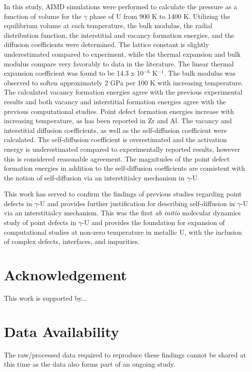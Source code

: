 \documentclass[review]{elsarticle}
\begin{document}
In this study, AIMD simulations were performed to calculate the pressure as a function of volume for the $\gamma$ phase of U from 900 K to 1400 K. Utilizing the equilibrium volume at each temperature, the bulk modulus, the radial distribution function, the interstitial and vacancy formation energies, and the diffusion coefficients were determined. The lattice constant is slightly underestimated compared to experiment, while the thermal expansion and bulk modulus compare very favorably to data in the literature. The linear thermal expansion coefficient was found to be 14.3 x 10$^{-6}$ K$^{-1}$. The bulk modulus was observed to soften approximately 2 GPa per 100 K with increasing temperature. The calculated vacancy formation energies agree with the previous experimental results and both vacancy and interstitial formation energies agree with the previous computational studies. Point defect formation energies increase with increasing temperature, as has been reported in Zr and Al. The vacancy and interstitial diffusion coefficients, as well as the self-diffusion coefficient were calculated. The self-diffusion coefficient is overestimated and the activation energy is underestimated compared to experimentally reported results, however this is considered reasonable agreement. The magnitudes of the point defect formation energies in addition to the self-diffusion coefficients are consistent with the notion of self-diffusion via an interstitialcy mechanism in $\gamma$-U. 

This work has served to confirm the findings of previous studies regarding point defects in $\gamma$-U and provides further justification for describing self-diffusion in $\gamma$-U via an interstitialcy mechanism. This was the first \textit{ab initio} molecular dynamics study of point defects in $\gamma$-U and provides the foundation for expansion of computational studies at non-zero temperature in metallic U, with the inclusion of complex defects, interfaces, and impurities.

\section{Acknowledgement}
This work is supported by...


\section{Data Availability}

The raw/processed data required to reproduce these findings cannot be shared at this time as the data also forms part of an ongoing study.




\end{document}
